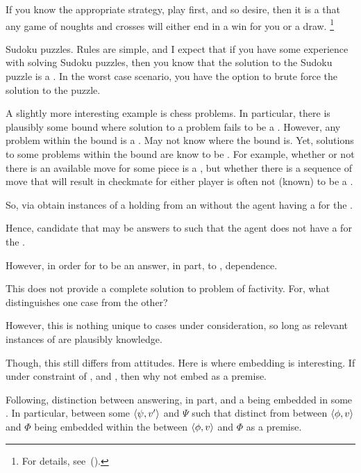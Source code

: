 \begin{note}
  If you know the appropriate strategy, play first, and so desire, then it is a  that any game of noughts and crosses will either end in a win for you or a draw.%
  \footnote{
    For details, see~(\cite[94--96]{Gardner:1983wn}).
  }

  Sudoku puzzles.
  Rules are simple, and I expect that if you have some experience with solving Sudoku puzzles, then you know that the solution to the Sudoku puzzle is a \fc{}.
  In the worst case scenario, you have the option to brute force the solution to the puzzle.

  A slightly more interesting example is chess problems.
  In particular, there is plausibly some bound where solution to a problem fails to be a \fc{}.
  However, any problem within the bound is a \fc{}.
  May not know where the bound is.
  Yet, solutions to some problems within the bound are know to be .
  For example, whether or not there is an available move for some piece is a , but whether there is a sequence of move that will result in checkmate for either player is often not (known) to be a \fc{}.
\end{note}

\begin{note}
  So, via  obtain instances of a  holding from an \agpe{} without the agent having a  for the .

  Hence, candidate \ros{} that may be answers to \qWhyVnP{} such that the agent does not have a  for the .

  However, in order for \ros{} to be an answer, in part, to \qWhyVnP{}, dependence.
\end{note}

\begin{note}
  This does not provide a complete solution to problem of factivity.
  For, what distinguishes one case from the other?

  However, this is nothing unique to cases under consideration, so long as relevant instances of \fc{} are plausibly knowledge.

  Though, this still differs from attitudes.
  Here is where embedding is interesting.
  If under constraint of \agpe{}, and \fc{}, then why not embed \fc{} as a premise.
\end{note}

\begin{note}
  Following, distinction between \ros{} answering, in part, \qWhyVnP{} and a \ros{} being embedded in some \ros{}.
  In particular, \ros{} between some \(\langle \psi, v' \rangle\) and \(\Psi\) such that distinct from \ros{} between \(\langle \phi, v \rangle\) and \(\Phi\) being embedded within the \ros{} between \(\langle \phi, v \rangle\) and \(\Phi\) as a premise.
\end{note}


